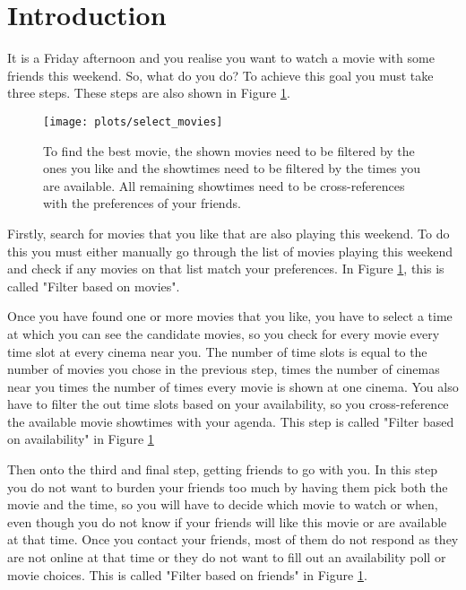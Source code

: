 \documentclass{article}
\begin{document}
 
 \section{Introduction} \label{intro}
 It is a Friday afternoon and you realise you want to watch a movie with some friends this weekend. So, what do you do? To achieve this goal you must take three steps. These steps are also shown in Figure \ref{movies}.
  
 \begin{figure}[H]
 \centering
 \texttt{[image: plots/select\_movies]}
 \caption[Movie selection process]{To find the best movie, the shown movies need to be filtered by the ones you like and the showtimes need to be filtered by the times you are available. All remaining showtimes need to be cross-references with the preferences of your friends.}
 \label{movies}
 \end{figure}
 
 Firstly, search for movies that you like that are also playing this weekend. To do this you must either manually go through the list of movies playing this weekend and check if any movies on that list match your preferences. In Figure \ref{movies}, this is called "Filter based on movies".
 
 Once you have found one or more movies that you like, you have to select a time at which you can see the candidate movies, so you check for every movie every time slot at every cinema near you. The number of time slots is equal to the number of movies you chose in the previous step, times the number of cinemas near you times the number of times every movie is shown at one cinema. You also have to filter the out time slots based on your availability, so you cross-reference the available movie showtimes with your agenda. This step is called "Filter based on availability" in Figure \ref{movies}
 
 Then onto the third and final step, getting friends to go with you. In this step you do not want to burden your friends too much by having them pick both the movie and the time, so you will have to decide which movie to watch or when, even though you do not know if your friends will like this movie or are available at that time. Once you contact your friends, most of them do not respond as they are not online at that time or they do not want to fill out an availability poll or movie choices. This is called "Filter based on friends" in Figure \ref{movies}.
\end{document}
